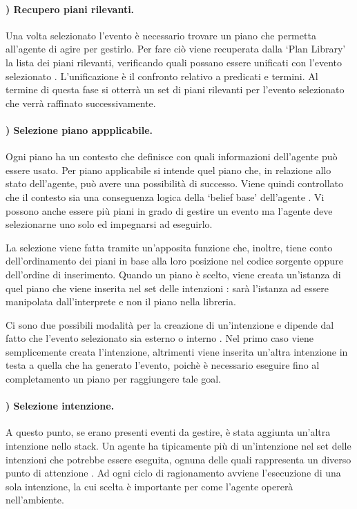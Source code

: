 \paragraph{) Recupero piani rilevanti.}
Una volta selezionato l'evento è necessario trovare un piano che permetta all'agente di agire per gestirlo. Per fare ciò viene recuperata dalla `Plan Library' la lista dei piani rilevanti, verificando quali possano essere unificati con l'evento selezionato \cite{JasonAgentSpeak}. L'unificazione è il confronto relativo a predicati e termini. Al termine di questa fase si otterrà un set di piani rilevanti per l'evento selezionato che verrà raffinato successivamente.

\paragraph{) Selezione piano appplicabile.}
Ogni piano ha un contesto che definisce con quali informazioni dell'agente può essere usato.
Per piano applicabile si intende quel piano che, in relazione allo stato dell'agente, può avere una possibilità di successo.
Viene quindi controllato che il contesto sia una conseguenza logica della `belief base' dell'agente \cite{JasonAgentSpeak}. Vi possono anche essere più piani in grado di gestire un evento ma l'agente deve selezionarne uno solo ed impegnarsi ad eseguirlo.

La selezione viene fatta tramite un'apposita funzione che, inoltre, tiene conto dell'ordinamento dei piani in base alla loro posizione nel codice sorgente oppure dell'ordine di inserimento. Quando un piano è scelto, viene creata un'istanza di quel piano che viene inserita nel set delle intenzioni \cite{JasonAgentSpeak}: sarà l'istanza ad essere manipolata dall'interprete e non il piano nella libreria.

Ci sono due possibili modalità per la creazione di un'intenzione e dipende dal fatto che l'evento selezionato sia esterno o interno \cite{JasonAgentSpeak}. Nel primo caso viene semplicemente creata l'intenzione, altrimenti viene inserita un'altra intenzione in testa a quella che ha generato l'evento, poichè è necessario eseguire fino al completamento un piano per raggiungere tale goal.

\paragraph{) Selezione intenzione.}
A questo punto, se erano presenti eventi da gestire, è stata aggiunta un'altra intenzione nello stack. Un agente ha tipicamente più di un'intenzione nel set delle intenzioni che potrebbe essere eseguita, ognuna delle quali rappresenta un diverso punto di attenzione \cite{JasonAgentSpeak}. Ad ogni ciclo di ragionamento avviene l'esecuzione di una sola intenzione, la cui scelta è importante per come l'agente opererà nell'ambiente.


